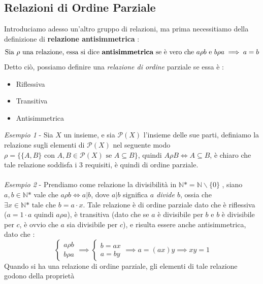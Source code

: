 \documentclass[12pt, letterpaper]{article}
\begin{document}
\subsection{Relazioni di Ordine Parziale}\label{ordParz}
Introduciamo adesso un'altro gruppo di relazioni, ma prima necessitiamo della definizione di \textbf{relazione antisimmetrica} :
\begin{equation}
    \text{Sia }\rho \text{ una relazione, essa si dice \textbf{antisimmetrica} se è vero che } a\rho b \text{ e } b\rho a \implies a=b 
\end{equation}
Detto ciò, possiamo definire una \textit{relazione di ordine} parziale se essa è :\begin{itemize}
    \item Riflessiva
    \item Transitiva
    \item Antisimmetrica
\end{itemize}
\textit{Esempio 1} - Sia \(X\) un insieme, e sia \(\mathcal{P} (X)\) l'insieme delle sue parti, definiamo 
la relazione sugli elementi di \(\mathcal{P} (X)\) nel seguente modo \(\rho = \{\{A,B\} \text{ con } A,B\in\mathcal{P}(X) \text{ se } A\subseteq B\}\),
quindi \(A\rho B \iff A\subseteq B\), è chiaro che tale relazione soddisfa i 3 requisiti, è quindi 
di ordine parziale.\\\hphantom{.}\\
\textit{Esempio 2} - Prendiamo come relazione la divisibilità in \(\mathbb{N}\text{*} = \mathbb{N}\backslash \{0\}\)  
, siano \(a,b \in \mathbb{N}\text{*}\) vale che \(a\rho b\iff a | b\), dove \(a|b\) significa \textit{ \(a\) divide \(b\)},
ossia che \(\exists x \in \mathbb{N}\text{*} \text{ tale che } b=a\cdot x\). Tale relazione è di ordine parziale 
dato che è riflessiva (\(a=1\cdot a\) quindi \(a\rho a\)), è transitiva (dato che se \(a\) è divisibile per \(b\)
e \(b\) è divisibile per \(c\), è ovvio che \(a\) sia divisibile per \(c\)), e risulta essere anche 
antisimmetrica, dato che : 
\begin{equation}
     \begin{cases} 
        a\rho b\\
        b\rho a 
     \end{cases}
     \implies 
     \begin{cases} 
        b=ax\\
        a=by 
     \end{cases}
     \implies a = (ax)y \implies xy = 1
\end{equation}
Quando si ha una relazione di ordine parziale, gli elementi di tale relazione godono della proprietà 
\end{document}
